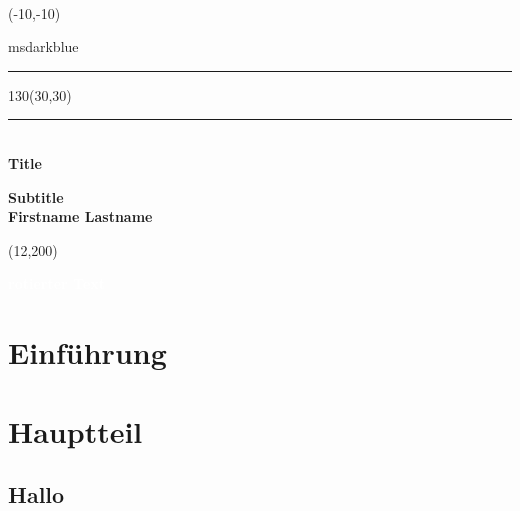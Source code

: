 \documentclass[10pt]{scrartcl}
\begin{document}
    \setlength{\TPHorizModule}{1mm}
    \setlength{\TPVertModule}{1mm}

    \begin{titlepage}
        ~
        \begin{textblock}{50}(-10,-10)
            \begin{color}{msdarkblue}
                \rule{3cm}{25cm}
            \end{color}
        \end{textblock}

        \begin{textblock}{130}(30,30)
            \rule{2cm}{2cm}\\[2em]   %

            {\noindent\Huge\bfseries Title }

            {\noindent\huge\bfseries Subtitle }\\[5em]

            {\noindent\Large\bfseries Firstname Lastname}

        \end{textblock}


        \begin{textblock}{20}(12,200)
            \begin{rotate}{90}
            {\huge\bfseries \textcolor{white}{rotierter Text}}
            \end{rotate}
        \end{textblock}

    \end{titlepage}


    \tableofcontents

    \clearpage

    \begin{abstract}
        \noindent \blindtext
    \end{abstract}


    \section{Einführung}

    \blindtext[2]


    \section{Hauptteil}

    \subsection{Hallo}
\end{document}
